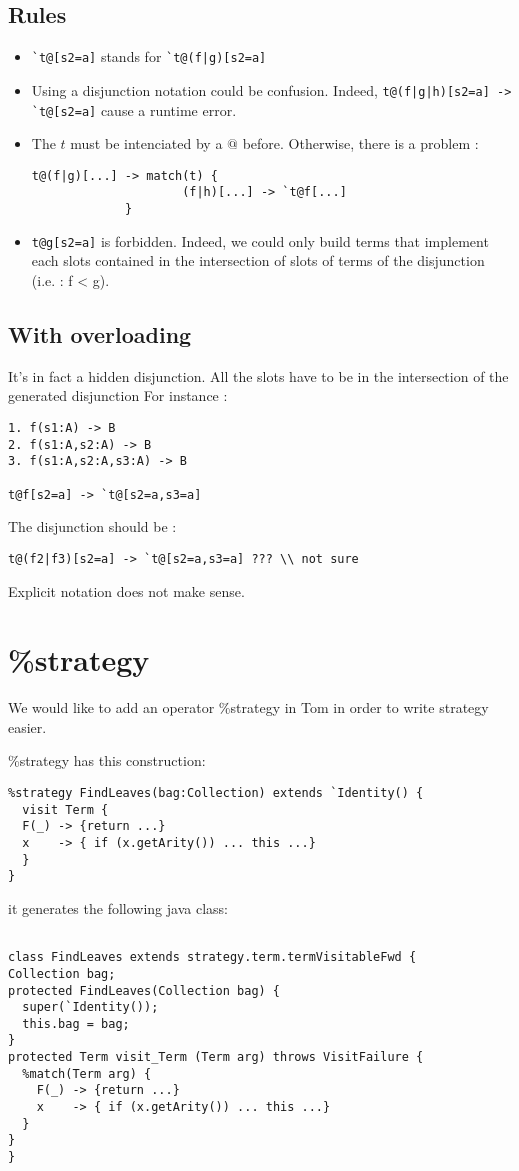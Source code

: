 \documentclass{article}
\begin{document}
\subsection{Rules}
\begin{itemize}
\item \verb$`t@[s2=a]$ stands for \verb$`t@(f|g)[s2=a]$
\item Using a disjunction notation could be confusion. Indeed, \verb$t@(f|g|h)[s2=a] -> `t@[s2=a]$ cause a runtime error.
\item The $t$ must be intenciated by a $@$ before. Otherwise, there is a problem :
\begin{verbatim}
t@(f|g)[...] -> match(t) {
                     (f|h)[...] -> `t@f[...]
             }
\end{verbatim}
\item \verb$t@g[s2=a]$ is forbidden. Indeed, we could only build terms that implement each slots contained in the intersection of slots of terms of the disjunction (i.e. : f < g).
\end{itemize}
\subsection{With overloading}
It's in fact a hidden disjunction. All the slots have to be in the intersection of the generated disjunction For instance :
\begin{verbatim}
1. f(s1:A) -> B
2. f(s1:A,s2:A) -> B
3. f(s1:A,s2:A,s3:A) -> B

t@f[s2=a] -> `t@[s2=a,s3=a]
\end{verbatim}
The disjunction should be :
\begin{verbatim}
t@(f2|f3)[s2=a] -> `t@[s2=a,s3=a] ??? \\ not sure
\end{verbatim}
Explicit notation does not make sense.

\section{\%strategy}

We would like to add an operator \%strategy in Tom in order to write strategy easier.

\%strategy has this construction:
\begin{verbatim}
%strategy FindLeaves(bag:Collection) extends `Identity() {
  visit Term {
  F(_) -> {return ...}
  x    -> { if (x.getArity()) ... this ...}
  }
}
\end{verbatim}
it generates the following java class:
\begin{verbatim}

class FindLeaves extends strategy.term.termVisitableFwd {
Collection bag;
protected FindLeaves(Collection bag) {
  super(`Identity());
  this.bag = bag;
}
protected Term visit_Term (Term arg) throws VisitFailure {
  %match(Term arg) {
    F(_) -> {return ...}
    x    -> { if (x.getArity()) ... this ...}
  }
}
}
\end{verbatim}
\end{document}
